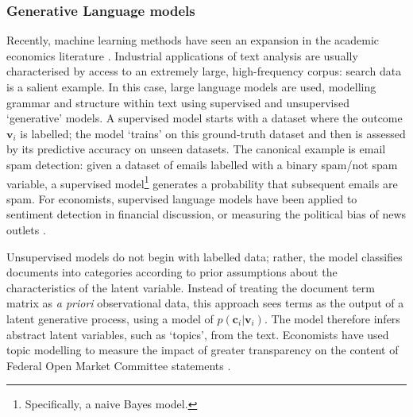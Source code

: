 \documentclass[12pt,a4]{article}
\begin{document}
\subsubsection{Generative Language models}
Recently, machine learning methods have seen an expansion in the academic economics literature \parencite{atheyMachineLearningMethods2019a}. Industrial applications of text analysis are usually characterised by access to an extremely large, high-frequency corpus: search data is a salient example. In this case, large language models are used, modelling grammar and structure within text using supervised and unsupervised `generative' models. A supervised model starts with a dataset where the outcome \(\mathbf{v}_i\) is labelled; the model `trains' on this ground-truth dataset and then is assessed by its predictive accuracy on unseen datasets. The canonical example is email spam detection: given a dataset of emails labelled with a binary spam/not spam variable, a supervised model\footnote{Specifically, a naive Bayes model.} generates a probability that subsequent emails are spam. For economists, supervised language models have been applied to sentiment detection in financial discussion, or measuring the political bias of news outlets \parencite{grosecloseMeasureMediaBias2005}.

Unsupervised models do not begin with labelled data; rather, the model classifies documents into categories according to prior assumptions about the characteristics of the latent variable. Instead of treating the document term matrix as \textit{a priori} observational data, this approach sees terms as the output of a latent generative process, using a model of \(p(\mathbf{c}_i|\mathbf{v}_i)\). The model therefore infers abstract latent variables, such as `topics', from the text. Economists have used topic modelling to measure the impact of greater transparency on the content of Federal Open Market Committee statements \parencite{hansenTransparencyDeliberationFOMC2018}.

\end{document}
